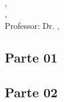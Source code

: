 \documentclass[a4paper, 11pt, answers]{exam}
\title{\titulo}
\author{\nomeAutorUm e \nomeAutorDois}
\date{\today}
\makeatletter
\newcommand{\printtitle}{
  \begin{center}
    {\Large \scshape \titulo}\\[1em]
    {\nomeAutorUm, \raAutorUm}\\
    {\nomeAutorDois, \raAutorDois}\\[1em]
    Professor: Dr\@. \nomeProfessor, \centroProfessor\\
    {\itshape \campusFaculdade}
  \end{center}
}
\makeatother
\begin{document}
  \printtitle

  \begin{questions}
    \section*{Parte 01}
    
  \end{questions}

  \begin{questions}
    \section*{Parte 02}
    
  \end{questions}
\end{document}
